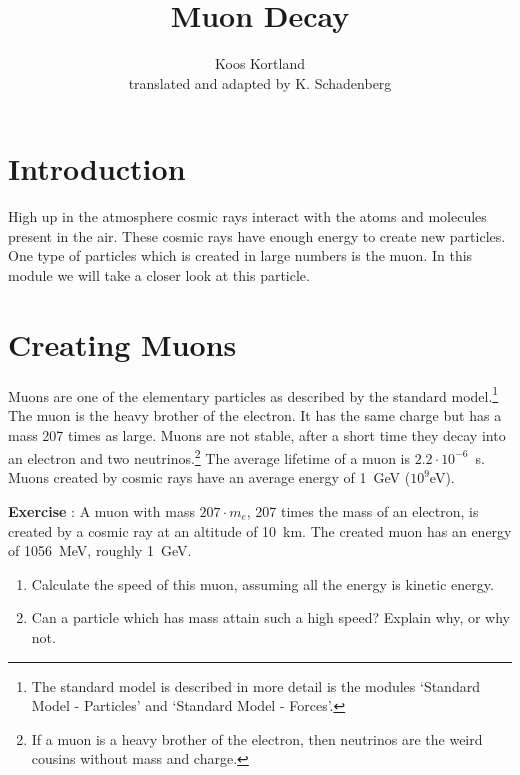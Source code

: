 


\author{Koos Kortland \\ translated and adapted by K. Schadenberg}
\date{}
\title{Muon Decay}



\maketitle

\section{Introduction}
High up in the atmosphere cosmic rays interact with the atoms and molecules present in the air. These cosmic rays have enough energy to create new particles. One type of particles which is created in large numbers is the muon. In this module we will take a closer look at this particle.

\section{Creating Muons}
Muons are one of the elementary particles as described by the standard model.\footnote{The standard model is described in more detail is the modules `Standard Model - Particles' and `Standard Model - Forces'.} The muon is the heavy brother of the electron. It has the same charge but has a mass 207 times as large. Muons are not stable, after a short time they decay into an electron and two neutrinos.\footnote{If a muon is a heavy brother of the electron, then neutrinos are the weird cousins without mass and charge.} The average lifetime of a muon is $2.2 \cdot 10^{-6}$~s. Muons created by cosmic rays have an average energy of 1~GeV ($10^9$eV).

\begin{shaded}
\textbf{Exercise \theExercise {}} : A muon with mass $207 \cdot m_e$, 207 times the mass of an electron, is created by a cosmic ray at an altitude of 10~km. The created muon has an energy of 1056~MeV, roughly 1~GeV. \\
\begin{enumerate}[-]
\item Calculate the speed of this muon, assuming all the energy is kinetic energy.
\item  Can a particle which has mass attain such a high speed? Explain why, or why not.
\end{enumerate}\end{shaded}

